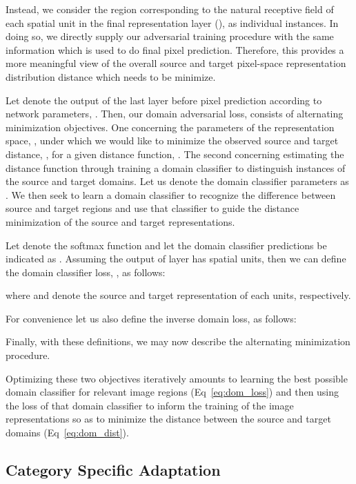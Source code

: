 \documentclass[10pt,twocolumn,letterpaper]{article}
\begin{document}
Instead, we consider the region corresponding to the natural receptive field of each spatial unit in the final representation layer (\eg ),  as individual instances. 
In doing so, we directly supply our adversarial training procedure with the same information which is used to do final pixel prediction. Therefore, this provides a more meaningful view of the overall source and target pixel-space representation distribution distance which needs to be minimize. 


Let  denote the output of the last layer before pixel prediction according to network parameters, . 
Then, our domain adversarial loss,  consists of alternating minimization objectives. One concerning the parameters of the representation space, , under which we would like to minimize the observed source and target distance, , for a given distance function, . The second concerning estimating the distance function through training a domain classifier to distinguish instances of the source and target domains. Let us denote the domain classifier parameters as . 
We then seek to learn a domain classifier to recognize the difference between source and target regions and use that classifier to guide the distance minimization of the source and target representations. 
 


Let  denote the softmax function and let the domain classifier predictions be indicated as . Assuming the output of layer  has  spatial units, then we can define the domain classifier loss, , as follows:

where  and  denote the source and target representation of each units, respectively.

For convenience let us also define the inverse domain loss,  as follows:

Finally, with these definitions, we may now describe the alternating minimization procedure.

Optimizing these two objectives iteratively amounts to learning the best possible domain classifier for relevant image regions (Eq~\eqref{eq:dom_loss}) and then using the loss of that domain classifier to inform the training of the image representations so as to minimize the distance between the source and target domains (Eq~\eqref{eq:dom_dist}).











\subsection{Category Specific Adaptation}\label{sec:category}
\end{document}
